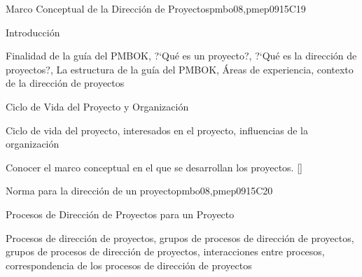 \begin{syllabus}
\begin{outcomes}
    \item {}
    \item {}
    \item {}
\end{outcomes}

\begin{competences}
    \item {} 
    \item {}
    \item {}
    \item {}
    \item {}
    \item {}
    \item {}
    \item {}
\end{competences}

\begin{unit}{Marco Conceptual de la Dirección de Proyectos}{}{pmbo08,pmep09}{15}{C19}
\begin{topics}
      \item Introducción
       \item Finalidad de la guía del PMBOK, ?`Qué es un proyecto?, ?`Qué es la dirección de proyectos?, La estructura de la guía del PMBOK, Áreas de experiencia, contexto de la dirección de proyectos
      \item Ciclo de Vida del Proyecto y Organización
       \item Ciclo de vida del proyecto, interesados en el proyecto, influencias de la organización
   \end{topics}

   \begin{learningoutcomes}
      \item Conocer el marco conceptual en el que se desarrollan los proyectos. [\Usage]
   \end{learningoutcomes}
\end{unit}

\begin{unit}{Norma para la dirección de un proyecto}{}{pmbo08,pmep09}{15}{C20}
\begin{topics}
      \item Procesos de Dirección de Proyectos para un Proyecto
       \item Procesos de dirección de proyectos, grupos de procesos de dirección de proyectos, grupos de procesos de dirección de proyectos, interacciones entre procesos, correspondencia de los procesos de dirección de proyectos
   \end{topics}


\end{unit}
\end{syllabus}
